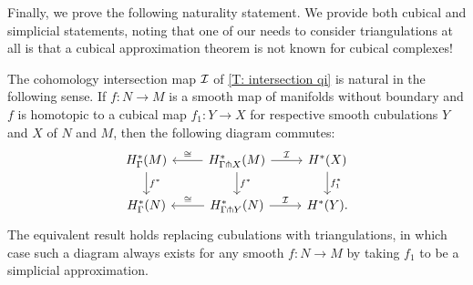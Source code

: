 Finally, we prove the following naturality statement.
We provide both cubical and simplicial statements, noting that one of our needs to consider triangulations at all is that a cubical approximation theorem is not known for cubical complexes!

\begin{theorem}\label{T: intersection natural}
	The cohomology intersection map $\mathcal{I}$ of \cref{T: intersection qi} is natural in the following sense.
	If $f \colon N \to M$ is a smooth map of manifolds without boundary and $f$ is homotopic to a cubical map $f_1 \colon Y \to X$ for respective smooth cubulations $Y$ and $X$ of $N$ and $M$, then the following diagram commutes:
	\begin{equation*}
		\begin{tikzcd}
		 	H^*_{\Gamma}(M) \arrow[d,"f^*"]	&\arrow[l,"\cong"'] H^*_{\Gamma \pf X}(M) \arrow[r,"\mc 	I"]\arrow[d,"f^*"]& H^*(X)\arrow[d,"f_1^*"]\\
			H^*_{\Gamma}(N) 	&\arrow[l,"\cong"'] H^*_{\Gamma \pf Y}(N) \arrow[r,"\mc I"]& H^*(Y).
		\end{tikzcd}
	\end{equation*}
	The equivalent result holds replacing cubulations with triangulations, in which case such a diagram always exists for any smooth $f \colon N \to M$ by taking $f_1$ to be a simplicial approximation.
\end{theorem}



